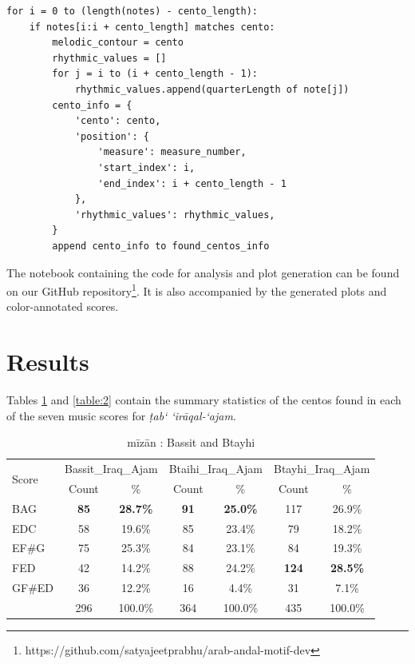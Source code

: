 \documentclass{article}
\begin{document}
{\tiny
\begin{verbatim}
for i = 0 to (length(notes) - cento_length):
    if notes[i:i + cento_length] matches cento:
        melodic_contour = cento
        rhythmic_values = []
        for j = i to (i + cento_length - 1):
            rhythmic_values.append(quarterLength of note[j])
        cento_info = {
            'cento': cento,
            'position': {
                'measure': measure_number,
                'start_index': i,
                'end_index': i + cento_length - 1
            },
            'rhythmic_values': rhythmic_values,
        }
        append cento_info to found_centos_info
\end{verbatim}
}

The notebook containing the code for analysis and plot generation can be found on our GitHub repository\footnote{https://github.com/satyajeetprabhu/arab-andal-motif-dev}. It is also accompanied by the generated plots and color-annotated scores. 

\section{Results}\label{sec:Results}

Tables \ref{table:1} and \ref{table:2} contain the summary statistics of the centos found in each of the seven music scores for \textit{ṭab‘ ‘irāqal-‘ajam}.

\begin{table}[htbp]
    \caption{mīzān : Bassit and Btayhi}
    \begin{adjustbox}{width=0.5\textwidth}
    \small %
    \begin{tabular}{@{}lcccccc@{}} %
        \toprule
        \multirow{2}{*}{Score} & \multicolumn{2}{c}{Bassit\_Iraq\_Ajam} & \multicolumn{2}{c}{Btaihi\_Iraq\_Ajam} & \multicolumn{2}{c}{Btayhi\_Iraq\_Ajam} \\
        \cmidrule(lr){2-3} \cmidrule(lr){4-5} \cmidrule(lr){6-7} %
         & Count & \% & Count & \% & Count & \% \\
        \midrule
        BAG & \textbf{85} & \textbf{28.7\%} & \textbf{91} & \textbf{25.0\%} & 117 & 26.9\% \\
        EDC & 58 & 19.6\% & 85 & 23.4\% & 79 & 18.2\% \\
        EF\#G & 75 & 25.3\% & 84 & 23.1\% & 84 & 19.3\% \\
        FED & 42 & 14.2\% & 88 & 24.2\% & \textbf{124} & \textbf{28.5\%} \\
        GF\#ED & 36 & 12.2\% & 16 & 4.4\% & 31 & 7.1\% \\
        \midrule
        & 296 & 100.0\% & 364 & 100.0\% & 435 & 100.0\% \\
        \bottomrule
    \end{tabular}
    \end{adjustbox}
    \label{table:1}
\end{table}
\end{document}
